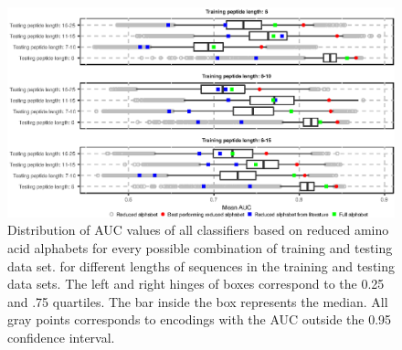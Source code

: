 \documentclass[a4,center,fleqn]{NAR}
\begin{document}
\begin{figure}[!tpb]
\centerline{\includegraphics{figures/AUC_boxplot.eps}}
\caption{Distribution of AUC values of all classifiers based on reduced amino acid 
alphabets for every possible combination of training and testing data set. 
%
%
%
%
%
%
%
for different lengths of sequences in the training and testing data sets. 
The left and right hinges of boxes correspond to the 0.25 and .75 quartiles. 
The bar inside the box represents the median. All gray points corresponds to
encodings with the AUC outside the 0.95 confidence interval. 
}\label{fig:AUC_boxplot} 
\end{figure}
\end{document}
